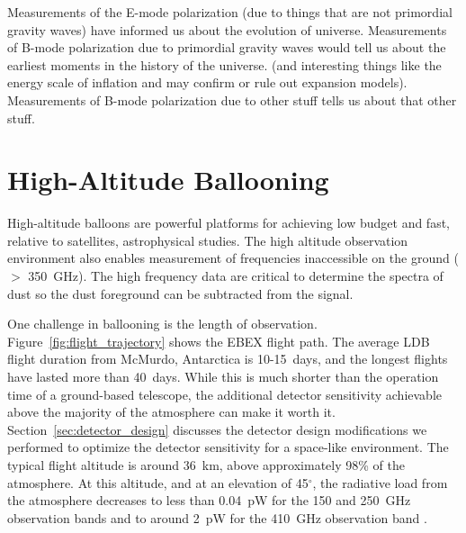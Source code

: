 Measurements of the E-mode polarization (due to things that are not primordial gravity waves) have informed us about the evolution of universe. 
Measurements of B-mode polarization due to primordial gravity waves would tell us about the earliest moments in the history of the universe. (and interesting things like the energy scale of inflation and may confirm or rule out expansion models).
Measurements of B-mode polarization due to other stuff tells us about that other stuff. 


\section{High-Altitude Ballooning}
\label{sec:balloons}


High-altitude balloons are powerful platforms for achieving low budget and fast, relative to satellites, astrophysical studies. 
The high altitude observation environment also enables measurement of frequencies inaccessible on the ground ($>$ 350~GHz). The high frequency data are critical to determine the spectra of dust so the dust foreground can be subtracted from the signal. 

One challenge in ballooning is the length of observation. 
Figure~\ref{fig:flight_trajectory} shows the \ac{EBEX} flight path. 
The average \ac{LDB} flight duration from McMurdo, Antarctica is 10-15~days, and the longest flights have lasted more than 40~days.  
While this is much shorter than the operation time of a ground-based telescope, the additional detector sensitivity achievable above the majority of the atmosphere can make it worth it. 
Section~\ref{sec:detector_design} discusses the detector design modifications we performed to optimize the detector sensitivity for a space-like environment. 
The typical flight altitude is around 36~km, above approximately 98\% of the atmosphere. 
At this altitude, and at an elevation of 45$^\circ$, the radiative load from the atmosphere decreases to less than 0.04~pW for the 150 and 250~GHz observation bands and to around 2~pW for the 410~GHz observation band \cite{Bao2015}. 

